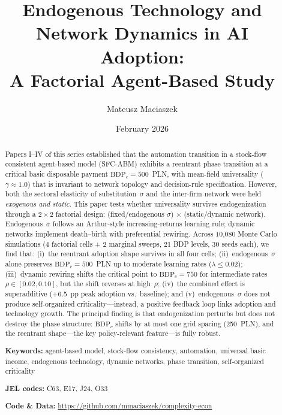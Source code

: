 \documentclass[12pt,a4paper]{article}
\title{\textbf{Endogenous Technology and Network Dynamics in AI Adoption:\\
A Factorial Agent-Based Study}}
\author{Mateusz Maciaszek}
\date{{\small February 2026}}
\begin{document}
\maketitle

\begin{abstract}

Papers I--IV of this series established that the automation transition in a
stock-flow consistent agent-based model (SFC-ABM) exhibits a reentrant phase
transition at a critical basic disposable payment $\mathrm{BDP}_c = 500$~PLN,
with mean-field universality ($\gamma \approx 1.0$) that is invariant to
network topology and decision-rule specification. However, both the sectoral
elasticity of substitution~$\sigma$ and the inter-firm network were held
\emph{exogenous and static}. This paper tests whether universality survives
endogenization through a $2 \times 2$ factorial design: (fixed/endogenous
$\sigma$) $\times$ (static/dynamic network). Endogenous~$\sigma$ follows an
Arthur-style increasing-returns learning rule; dynamic networks implement
death--birth with preferential rewiring. Across 10,080 Monte Carlo simulations
(4 factorial cells + 2 marginal sweeps, 21 BDP levels, 30 seeds each), we
find that: (i)~the reentrant adoption shape survives in all four cells;
(ii)~endogenous~$\sigma$ alone preserves $\mathrm{BDP}_c = 500$~PLN up to
moderate learning rates ($\lambda \le 0.02$); (iii)~dynamic rewiring shifts
the critical point to $\mathrm{BDP}_c = 750$ for intermediate rates
$\rho \in [0.02, 0.10]$, but the shift reverses at high~$\rho$;
(iv)~the combined effect is superadditive (+6.5~pp peak adoption vs.\
baseline); and (v)~endogenous~$\sigma$ does not produce self-organized
criticality---instead, a positive feedback loop links adoption and technology
growth. The principal finding is that endogenization perturbs but does not
destroy the phase structure: $\mathrm{BDP}_c$ shifts by at most one grid
spacing (250~PLN), and the reentrant shape---the key policy-relevant
feature---is fully robust.

\medskip\noindent
\textbf{Keywords:} agent-based model, stock-flow consistency, automation,
universal basic income, endogenous technology, dynamic networks,
phase transition, self-organized criticality

\medskip\noindent
\textbf{JEL codes:} C63, E17, J24, O33

\medskip\noindent
\textbf{Code \& Data:}
\url{https://github.com/mmaciaszek/complexity-econ}

\end{abstract}
\end{document}
